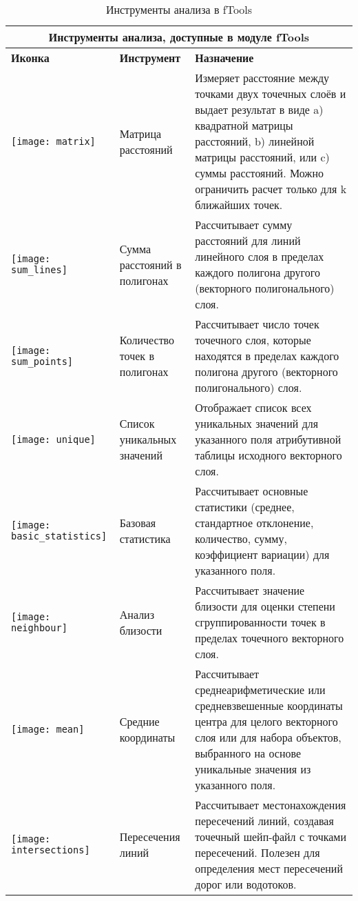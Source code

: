\begin{table}[ht]
\centering
 \begin{tabular}{|m{1cm}|m{3cm}|m{9cm}|}
\hline \multicolumn{3}{|c|}{\textbf{Инструменты анализа, доступные в  модуле fTools}} \\
 \hline \textbf{Иконка} & \textbf{Инструмент} & \textbf{Назначение} \\
 \hline \texttt{[image: matrix]} & Матрица расстояний &
 Измеряет расстояние между точками двух точечных слоёв и выдает результат в виде
 a) квадратной матрицы расстояний, b) линейной матрицы расстояний, или c) суммы расстояний.
 Можно ограничить расчет только для k ближайших точек. \\
 \hline \texttt{[image: sum\_lines]} & Сумма расстояний в полигонах & Рассчитывает
 сумму расстояний для линий линейного слоя в пределах каждого полигона другого
 (векторного полигонального) слоя. \\
 \hline \texttt{[image: sum\_points]} & Количество точек в полигонах & Рассчитывает
 число точек точечного слоя, которые находятся в пределах каждого полигона другого
 (векторного полигонального) слоя. \\
 \hline \texttt{[image: unique]} & Список уникальных значений & Отображает
 список всех уникальных значений для указанного поля атрибутивной таблицы
 исходного векторного слоя. \\
 \hline \texttt{[image: basic\_statistics]} & Базовая статистика & Рассчитывает
 основные статистики (среднее, стандартное отклонение, количество,
 сумму, коэффициент вариации) для указанного поля. \\
 \hline \texttt{[image: neighbour]} & Анализ близости
 & Рассчитывает значение близости для оценки степени сгруппированности точек
 в пределах точечного векторного слоя. \\
 \hline \texttt{[image: mean]} & Средние координаты &
 Рассчитывает среднеарифметические или средневзвешенные координаты центра для целого векторного слоя
 или для набора объектов, выбранного на основе уникальные значения из указанного поля. \\
 \hline \texttt{[image: intersections]} & Пересечения линий &
 Рассчитывает местонахождения пересечений линий, создавая точечный шейп-файл с точками пересечений.
 Полезен для определения мест пересечений дорог или водотоков. \\
 \hline
\end{tabular}
\caption{Инструменты анализа в fTools}\label{tab:ftool_analysis}
\end{table}


